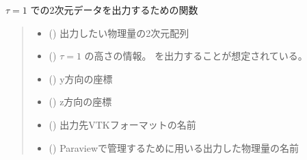 \documentclass[letterpaper,10pt,dvipdfmx,report]{sphinxmanual}
\begin{document}
\begin{fulllineitems}
\label{\detokenize{paraview:R2D2.vtk.write_optical_surface}}
\pysigstartsignatures
{}
\pysigstopsignatures
\sphinxAtStartPar
\(\tau=1\) での2次元データを出力するための関数
\begin{quote}\begin{description}
\begin{itemize}
\item {} 
\sphinxAtStartPar
{} () \sphinxhyphen{}\sphinxhyphen{} 出力したい物理量の2次元配列

\item {} 
\sphinxAtStartPar
{} () \sphinxhyphen{}\sphinxhyphen{} \(\tau=1\) の高さの情報。 を出力することが想定されている。

\item {} 
\sphinxAtStartPar
{} () \sphinxhyphen{}\sphinxhyphen{} y方向の座標

\item {} 
\sphinxAtStartPar
{} () \sphinxhyphen{}\sphinxhyphen{} z方向の座標

\item {} 
\sphinxAtStartPar
{} () \sphinxhyphen{}\sphinxhyphen{} 出力先VTKフォーマットの名前

\item {} 
\sphinxAtStartPar
{} () \sphinxhyphen{}\sphinxhyphen{} Paraviewで管理するために用いる出力した物理量の名前

\end{itemize}

\end{description}\end{quote}

\end{fulllineitems}
\end{document}
